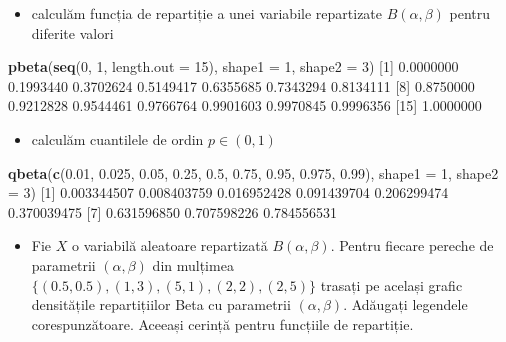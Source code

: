 \documentclass[]{article}
\newenvironment{Shaded}{\begin{snugshade}}{\end{snugshade}}
\newcommand{\KeywordTok}[1]{\textcolor[rgb]{0.13,0.29,0.53}{\textbf{#1}}}
\newcommand{\DataTypeTok}[1]{\textcolor[rgb]{0.13,0.29,0.53}{#1}}
\newcommand{\DecValTok}[1]{\textcolor[rgb]{0.00,0.00,0.81}{#1}}
\newcommand{\FloatTok}[1]{\textcolor[rgb]{0.00,0.00,0.81}{#1}}
\newcommand{\NormalTok}[1]{#1}
\providecommand{\tightlist}{%
  \setlength{\itemsep}{0pt}\setlength{\parskip}{0pt}}
\newenvironment{frshaded*}{%
  \def\FrameCommand{\fboxrule=\FrameRule\fboxsep=\FrameSep \fcolorbox{framecolor}{shadecolor1}}%
  \MakeFramed {\advance\hsize-\width \FrameRestore}}%
{\endMakeFramed}
\newenvironment{rmdblock}[1]
  {\begin{frshaded*}
  \begin{itemize}
  \renewcommand{\labelitemi}{
    \raisebox{-.7\height}[0pt][0pt]{
      {\setkeys{Gin}{width=2em,keepaspectratio}\texttt{[image: images/icons/\#1]}}
    }
  }
  \item
  }
  {
  \end{itemize}
  \end{frshaded*}
  }
\newenvironment{rmdexercise}
  {\begin{rmdblock}{exercise}}
  {\end{rmdblock}}
\begin{document}
\begin{itemize}
\tightlist
\item
  calculăm funcția de repartiție a unei variabile repartizate
  \(B(\alpha, \beta)\) pentru diferite valori
\end{itemize}

\begin{Shaded}
\begin{Highlighting}[]
\KeywordTok{pbeta}\NormalTok{(}\KeywordTok{seq}\NormalTok{(}\DecValTok{0}\NormalTok{, }\DecValTok{1}\NormalTok{, }\DataTypeTok{length.out =} \DecValTok{15}\NormalTok{), }\DataTypeTok{shape1 =} \DecValTok{1}\NormalTok{, }\DataTypeTok{shape2 =} \DecValTok{3}\NormalTok{)}
\NormalTok{ [}\DecValTok{1}\NormalTok{] }\FloatTok{0.0000000} \FloatTok{0.1993440} \FloatTok{0.3702624} \FloatTok{0.5149417} \FloatTok{0.6355685} \FloatTok{0.7343294} \FloatTok{0.8134111}
\NormalTok{ [}\DecValTok{8}\NormalTok{] }\FloatTok{0.8750000} \FloatTok{0.9212828} \FloatTok{0.9544461} \FloatTok{0.9766764} \FloatTok{0.9901603} \FloatTok{0.9970845} \FloatTok{0.9996356}
\NormalTok{[}\DecValTok{15}\NormalTok{] }\FloatTok{1.0000000}
\end{Highlighting}
\end{Shaded}

\begin{itemize}
\tightlist
\item
  calculăm cuantilele de ordin \(p\in(0,1)\)
\end{itemize}

\begin{Shaded}
\begin{Highlighting}[]
\KeywordTok{qbeta}\NormalTok{(}\KeywordTok{c}\NormalTok{(}\FloatTok{0.01}\NormalTok{, }\FloatTok{0.025}\NormalTok{, }\FloatTok{0.05}\NormalTok{, }\FloatTok{0.25}\NormalTok{, }\FloatTok{0.5}\NormalTok{, }\FloatTok{0.75}\NormalTok{, }\FloatTok{0.95}\NormalTok{, }\FloatTok{0.975}\NormalTok{, }\FloatTok{0.99}\NormalTok{), }\DataTypeTok{shape1 =} \DecValTok{1}\NormalTok{, }\DataTypeTok{shape2 =} \DecValTok{3}\NormalTok{)}
\NormalTok{[}\DecValTok{1}\NormalTok{] }\FloatTok{0.003344507} \FloatTok{0.008403759} \FloatTok{0.016952428} \FloatTok{0.091439704} \FloatTok{0.206299474} \FloatTok{0.370039475}
\NormalTok{[}\DecValTok{7}\NormalTok{] }\FloatTok{0.631596850} \FloatTok{0.707598226} \FloatTok{0.784556531}
\end{Highlighting}
\end{Shaded}

\begin{rmdexercise}
Fie \(X\) o variabilă aleatoare repartizată \(B(\alpha, \beta)\). Pentru
fiecare pereche de parametrii \((\alpha, \beta)\) din mulțimea
\(\{(0.5,0.5), (1, 3), (5, 1), (2, 2), (2, 5)\}\) trasați pe același
grafic densitățile repartițiilor Beta cu parametrii \((\alpha, \beta)\).
Adăugați legendele corespunzătoare. Aceeași cerință pentru funcțiile de
repartiție.
\end{rmdexercise}
\end{document}
